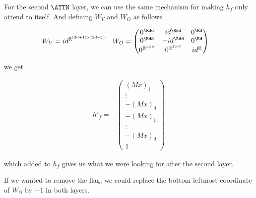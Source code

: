 
\medskip


For the second $\ATTN$ layer, we can use the same mechanism for making $h_f$ only attend to itself.
And defining $W_V$ and $W_O$ as follows

\begin{align*}
    W_V &= id^{\mathbb{R}^{(2d+1)\times (2d+1)}}
    & 
    W_O &= \left(\begin{matrix}
                0^{\Rdd}                   &id^{\Rdd}                  &0^{\Rd} \\
                0^{\Rdd}                   &-id^{\Rdd}                 &0^{\Rd} \\
                0^{\mathbb{R}^{1\times d}} &0^{\mathbb{R}^{1\times d}} &id^{\mathbb{R}}
          \end{matrix}\right)
\end{align*}

\noindent we get

\begin{align*}
    h'_f = 
    & \left( \begin{matrix} (Mx)_1 \\ \vdots \\ -(Mx)_d \\ -(Mx)_1 \\ \vdots \\ -(Mx)_d \\ 1 \end{matrix} \right)
\end{align*}

\noindent which added to $h_f$ gives us what we were looking for after the second layer.



\medskip

If we wanted to remove the flag, we could replace the bottom leftmost coordinate of $W_O$ by $-1$ in both layers.
